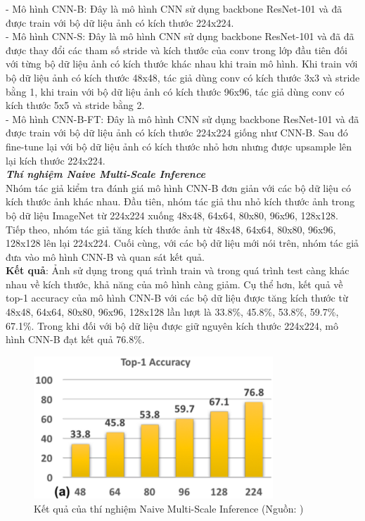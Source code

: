 {    \noindent
    - Mô hình CNN-B: Đây là mô hình CNN sử dụng backbone ResNet-101 và đã được train với bộ dữ liệu ảnh có kích thước 224x224. \\
    - Mô hình CNN-S: Đây là mô hình CNN sử dụng backbone ResNet-101 và đã đã được thay đổi các tham số stride và kích thước của conv trong lớp đầu tiên đối với từng bộ dữ liệu ảnh có kích thước khác nhau khi train mô hình.
    Khi train với bộ dữ liệu ảnh có kích thước 48x48, tác giả dùng conv có kích thước 3x3 và stride bằng 1,
    khi train với bộ dữ liệu ảnh có kích thước 96x96, tác giả dùng conv có kích thước 5x5 và stride bằng 2. \\
    - Mô hình CNN-B-FT: Đây là mô hình CNN sử dụng backbone ResNet-101 và đã được train với bộ dữ liệu ảnh có kích thước 224x224 giống như CNN-B. Sau đó fine-tune lại với bộ dữ liệu ảnh có kích thước nhỏ hơn nhưng được upsample lên lại kích thước 224x224. \\

    \noindent
    \textbf{\textit{Thí nghiệm Naive Multi-Scale Inference}} \\
    Nhóm tác giả kiểm tra đánh giá mô hình CNN-B đơn giản với các bộ dữ liệu có kích thước ảnh khác nhau.
    Đầu tiên, nhóm tác giả thu nhỏ kích thước ảnh trong bộ dữ liệu ImageNet từ 224x224 xuống 48x48, 64x64, 80x80, 96x96, 128x128.
    Tiếp theo, nhóm tác giả tăng kích thước ảnh từ 48x48, 64x64, 80x80, 96x96, 128x128 lên lại 224x224.
    Cuối cùng, với các bộ dữ liệu mới nói trên, nhóm tác giả đưa vào mô hình CNN-B và quan sát kết quả. \\
    \textbf{Kết quả}: Ảnh sử dụng trong quá trình train và trong quá trình test càng khác nhau về kích thước, khả năng của mô hình càng giảm.
    Cụ thể hơn, kết quả về top-1 accuracy của mô hình CNN-B với các bộ dữ liệu được tăng kích thước từ 48x48, 64x64, 80x80, 96x96, 128x128 lần lượt là 33.8\%, 45.8\%, 53.8\%, 59.7\%, 67.1\%.
    Trong khi đối với bộ dữ liệu được giữ nguyên kích thước 224x224, mô hình CNN-B đạt kết quả 76.8\%.

    \begin{figure}[H]
        \centering
        \includegraphics[width=9cm] {images/snip_naive_multi_scale_infer}
        \caption{Kết quả của thí nghiệm Naive Multi-Scale Inference (Nguồn: \cite{singh2018analysis})}
        \label{fig:snip_naive_multi_scale_infer}
    \end{figure}

}
